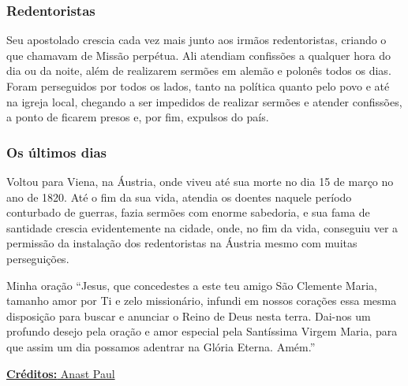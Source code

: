 \documentclass[18pt]{article}
\begin{document}
\begin{justify}
\begin{justify}
 \subsubsection{Redentoristas}
\end{justify}

Seu apostolado crescia cada vez mais junto aos irmãos redentoristas, criando o que chamavam de Missão perpétua. Ali atendiam confissões a qualquer hora do dia ou da noite, além de realizarem sermões em alemão e polonês todos os dias. Foram perseguidos por todos os lados, tanto na política quanto pelo povo e até na igreja local, chegando a ser impedidos de realizar sermões e atender confissões, a ponto de ficarem presos e, por fim, expulsos do país.

\vspace{.4cm}
\begin{justify}
 \subsubsection{Os últimos dias}
\end{justify}

Voltou para Viena, na Áustria, onde viveu até sua morte no dia 15 de março no ano de 1820. Até o fim da sua vida, atendia os doentes naquele período conturbado de guerras, fazia sermões com enorme sabedoria, e sua fama de santidade crescia evidentemente na cidade, onde, no fim da vida, conseguiu ver a permissão da instalação dos redentoristas na Áustria mesmo com muitas perseguições.

Minha oração
“Jesus, que concedestes a este teu amigo São Clemente Maria, tamanho amor por Ti e zelo missionário, infundi em nossos corações essa mesma disposição para buscar e anunciar o Reino de Deus nesta terra. Dai-nos um profundo desejo pela oração e amor especial pela Santíssima Virgem Maria, para que assim um dia possamos adentrar na Glória Eterna. Amém.”

\href{https://anastpaul.com/2021/03/13/saint-of-the-day-13-march-saint-roderick-died-857-priest-and-martyr/}{\textbf{Créditos: } Anast Paul}

\end{justify}
\end{document}
